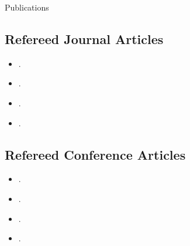 \begin{rSection}{Publications}



    

\subsection*{Refereed Journal Articles}
\begin{itemize}
    \setlength\itemsep{0.5em}
    \item {}.
    \item {}.
    \item {}.
    \item {}.
\end{itemize}

\subsection*{Refereed Conference Articles}
\begin{itemize}
    \setlength\itemsep{0.5em}
    \item {}.
    \item {}.
    \item {}.
    \item {}.
\end{itemize}

\end{rSection}